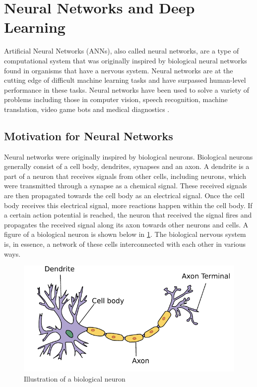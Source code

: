 \section{Neural Networks and Deep Learning}

Artificial Neural Networks (ANNs), also called neural networks, are a type of computational system that was originally inspired by biological neural networks found in organisms that have a nervous system. Neural networks are at the cutting edge of difficult machine learning tasks and have surpassed human-level performance in these tasks. Neural networks have been used to solve a variety of problems including those in computer vision, speech recognition, machine translation, video game bots and medical diagnostics \cite{imagenet_cnn,acoustic_modeling_speech,neural_translation,atari_deep_reinforcement_learning,3d_conf_for_alzheimers}.

\subsection{Motivation for Neural Networks}

Neural networks were originally inspired by biological neurons. Biological neurons generally consist of a cell body, dendrites, synapses and an axon. A dendrite is a part of a neuron that receives signals from other cells, including neurons, which were transmitted through a synapse as a chemical signal. These received signals are then propagated towards the cell body as an electrical signal. Once the cell body receives this electrical signal, more reactions happen within the cell body. If a certain action potential is reached, the neuron that received the signal fires and propagates the received signal along its axon towards other neurons and cells. A figure of a biological neuron is shown below in \cref{fig:bioneuron}. The biological nervous system is, in essence, a network of these cells interconnected with each other in various ways. 

\begin{figure}[!ht]
	\centering
	\includegraphics[width=0.7\linewidth]{pictures/Neuron.pdf}
	\caption[Illustration of a biological neuron]{Illustration of a biological neuron\cite{wiki:neuronpic}}\label{fig:bioneuron}  
\end{figure}


